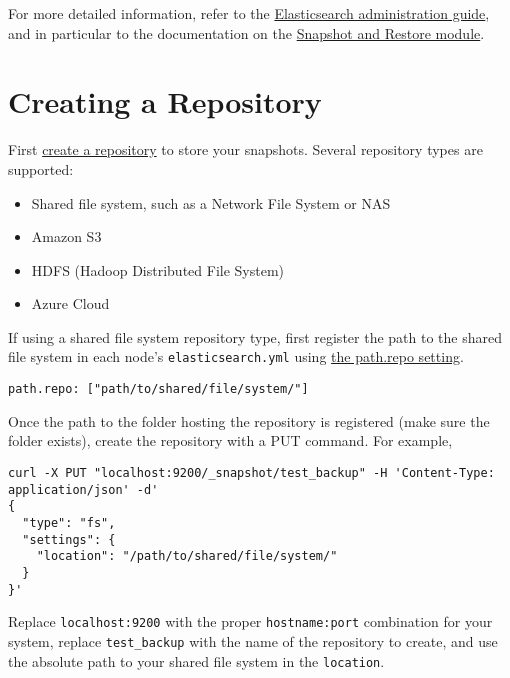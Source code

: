 For more detailed information, refer to the
\href{https://www.elastic.co/guide/en/elasticsearch/guide/master/administration.html}{Elasticsearch
administration guide}, and in particular to the documentation on the
\href{https://www.elastic.co/guide/en/elasticsearch/reference/7.x/snapshot-restore.html}{Snapshot
and Restore module}.

\section{Creating a Repository}\label{creating-a-repository}

First
\href{https://www.elastic.co/guide/en/elasticsearch/reference/7.x/snapshots-register-repository.html}{create
a repository} to store your snapshots. Several repository types are
supported:

\begin{itemize}
\tightlist
\item
  Shared file system, such as a Network File System or NAS
\item
  Amazon S3
\item
  HDFS (Hadoop Distributed File System)
\item
  Azure Cloud
\end{itemize}

If using a shared file system repository type, first register the path
to the shared file system in each node's \texttt{elasticsearch.yml}
using
\href{https://www.elastic.co/guide/en/elasticsearch/reference/7.x/snapshots-register-repository.html\#snapshots-filesystem-repository}{the
path.repo setting}.

\begin{verbatim}
path.repo: ["path/to/shared/file/system/"]
\end{verbatim}

Once the path to the folder hosting the repository is registered (make
sure the folder exists), create the repository with a PUT command. For
example,

\begin{verbatim}
curl -X PUT "localhost:9200/_snapshot/test_backup" -H 'Content-Type: application/json' -d'
{
  "type": "fs",
  "settings": {
    "location": "/path/to/shared/file/system/"
  }
}'
\end{verbatim}

Replace \texttt{localhost:9200} with the proper \texttt{hostname:port}
combination for your system, replace \texttt{test\_backup} with the name
of the repository to create, and use the absolute path to your shared
file system in the \texttt{location}.

